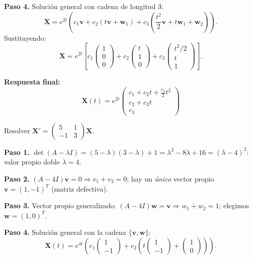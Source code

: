\begin{example}
\begin{myproof}
\textbf{Paso 4.} Solución general con cadena de longitud 3:
\[
\mathbf{X}=e^{2t}\left(c_1\mathbf{v}+c_2(t\mathbf{v}+\mathbf{w}_1)+c_3\left(\frac{t^2}{2}\mathbf{v}+t\mathbf{w}_1+\mathbf{w}_2\right)\right).
\]
Sustituyendo:
\[
\mathbf{X}=e^{2t}
\left[
c_1
\begin{pmatrix}
1\\0\\0
\end{pmatrix}
+c_2
\begin{pmatrix}
t\\1\\0
\end{pmatrix}
+c_3
\begin{pmatrix}
t^2/2\\ t\\1
\end{pmatrix}
\right].
\]

\textbf{Respuesta final:}
\[
\boxed{
\mathbf{X}(t)=e^{2t}
\begin{pmatrix}
c_1+c_2 t+\frac{c_3}{2}t^2\\
c_2+c_3 t\\
c_3
\end{pmatrix}
}
\]
\end{myproof}
\end{example}

\begin{example}
Resolver $\mathbf{X}'=\begin{pmatrix}5&1\\-1&3\end{pmatrix}\mathbf{X}$.

\begin{myproof}
\textbf{Paso 1.} $\det(A-\lambda I)=(5-\lambda)(3-\lambda)+1=\lambda^2-8\lambda+16=(\lambda-4)^2$: valor propio doble $\lambda=4$.

\textbf{Paso 2.} $(A-4I)\mathbf{v}=0\Rightarrow v_1+v_2=0$; hay un \emph{único} vector propio $\mathbf{v}=(1,-1)^T$ (matriz defectiva).

\textbf{Paso 3.} Vector propio generalizado: $(A-4I)\mathbf{w}=\mathbf{v}\Rightarrow w_1+w_2=1$; elegimos $\mathbf{w}=(1,0)^T$.

\textbf{Paso 4.} Solución general con la cadena $\{\mathbf{v},\mathbf{w}\}$:
\[
\boxed{\mathbf{X}(t)=e^{4t}\!\left(c_1\begin{pmatrix}1\\-1\end{pmatrix}+c_2\left(t\begin{pmatrix}1\\-1\end{pmatrix}+\begin{pmatrix}1\\0\end{pmatrix}\right)\right).}
\]
\end{myproof}
\end{example}

